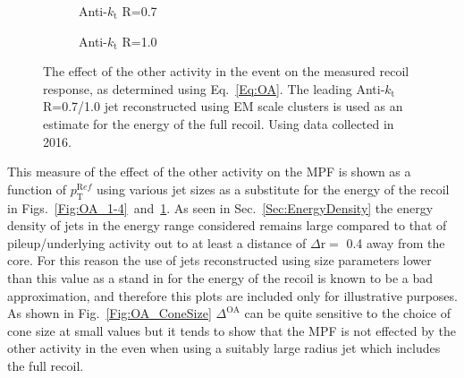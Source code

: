 \begin{figure}[!ht]
  \centering
  \begin{subfigure}{.5\textwidth}
    \centering
    \caption{Anti-$k_\mathrm{t}$ R=0.7}
  \end{subfigure}%
  \begin{subfigure}{.5\textwidth}  \centering
    \caption{Anti-$k_\mathrm{t}$ R=1.0}
  \end{subfigure}
  \caption[$\Delta^{\mathrm{OA}}$ using Anti-$k_\mathrm{t}$ R=0.7/1.0 jets]
{\small The effect of the other activity in the event on the measured recoil response, as determined using Eq.~\ref{Eq:OA}.  The leading Anti-$k_\mathrm{t}$ R=0.7/1.0 jet reconstructed using EM scale clusters is used as an estimate for the energy of the full recoil.  Using data collected in 2016.  }
  \label{Fig:OA_7-10}
\end{figure}

This measure of the effect of the other activity on the MPF is shown as a function of $p_{\mathrm T}^{\mathrm Ref}$ using various jet sizes as a substitute for the energy of the recoil in Figs.~\ref{Fig:OA_1-4}~and~\ref{Fig:OA_7-10}.  
As seen in Sec.~\ref{Sec:EnergyDensity} the energy density of jets in the energy range considered remains large compared to that of pileup/underlying activity out to at least a distance of $\Delta\mathrm{r}=$ 0.4 away from the core.  
For this reason the use of jets reconstructed using size parameters lower than this value as a stand in for the energy of the recoil is known to be a bad approximation, and therefore this plots are included only for illustrative purposes.  
As shown in Fig.~\ref{Fig:OA_ConeSize} $\Delta^{\mathrm{OA}}$ can be quite sensitive to the choice of cone size at small values but it tends to show that the MPF is not effected by the other activity in the even when using a suitably large radius jet which includes the full recoil.  


